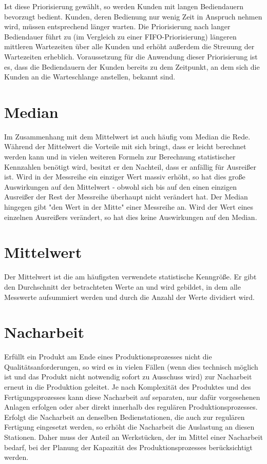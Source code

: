 Ist diese Priorisierung gewählt, so werden Kunden mit langen Bediendauern bevorzugt bedient.
Kunden, deren Bedienung nur wenig Zeit in Anspruch nehmen wird, müssen entsprechend länger warten.
Die Priorisierung nach langer Bediendauer führt zu (im Vergleich zu einer FIFO-Priorisierung)
längeren mittleren Wartezeiten über alle Kunden und erhöht außerdem die Streuung der Wartezeiten
erheblich. Voraussetzung für die Anwendung dieser Priorisierung ist es, dass die Bediendauern
der Kunden bereits zu dem Zeitpunkt, an dem sich die Kunden an die Warteschlange anstellen, bekannt sind.

\section*{Median}


Im Zusammenhang mit dem Mittelwert
ist auch häufig vom Median die Rede. Während der Mittelwert die Vorteile
mit sich bringt, dass er leicht berechnet werden kann und in vielen weiteren
Formeln zur Berechnung statistischer Kennzahlen benötigt wird, besitzt er
den Nachteil, dass er anfällig für Ausreißer ist. Wird in der Messreihe
ein einziger Wert massiv erhöht, so hat dies große Auswirkungen auf den
Mittelwert - obwohl sich bis auf den einen einzigen Ausreißer der Rest
der Messreihe überhaupt nicht verändert hat. Der Median hingegen gibt
"den Wert in der Mitte" einer Messreihe an. Wird der Wert eines einzelnen
Ausreißers verändert, so hat dies keine Auswirkungen auf den Median.

\section*{Mittelwert}


Der Mittelwert ist die am häufigsten verwendete statistische Kenngröße.
Er gibt den Durchschnitt der betrachteten Werte an und wird gebildet, in
dem alle Messwerte aufsummiert werden und durch die Anzahl der Werte
dividiert wird.

\section*{Nacharbeit}


Erfüllt ein Produkt am Ende eines Produktionsprozesses nicht die Qualitätsanforderungen,
so wird es in vielen Fällen (wenn dies technisch möglich ist und das Produkt nicht notwendig
sofort zu Ausschuss wird) zur Nacharbeit erneut in die Produktion geleitet. Je nach Komplexität
des Produktes und des Fertigungsprozesses kann diese Nacharbeit auf separaten, nur dafür
vorgesehenen Anlagen erfolgen oder aber direkt innerhalb des regulären Produktionsprozesses.
Erfolgt die Nacharbeit an denselben Bedienstationen, die auch zur regulären Fertigung eingesetzt
werden, so erhöht die Nacharbeit die Auslastung an diesen Stationen. Daher muss der  Anteil an
Werkstücken, der im Mittel einer Nacharbeit bedarf, bei der Planung der Kapazität des
Produktionsprozesses berücksichtigt werden.


